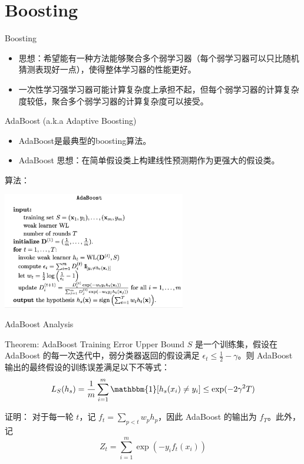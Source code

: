 \section{Boosting}

\begin{frame}{Boosting}
\begin{itemize}
    \item 思想：希望能有一种方法能够聚合多个弱学习器（每个弱学习器可以只比随机猜测表现好一点），使得整体学习器的性能更好。
    \item 一次性学习强学习器可能计算复杂度上承担不起，但每个弱学习器的计算复杂度较低，聚合多个弱学习器的计算复杂度可以接受。
\end{itemize}
\end{frame}

\begin{frame}{AdaBoost (a.k.a Adaptive Boosting)}
\begin{itemize}
    \item AdaBoost是最典型的boosting算法。
    \item AdaBoost 思想：在简单假设类上构建线性预测期作为更强大的假设类。
\end{itemize}
算法：
\begin{center}
    \includegraphics[width=0.6\textwidth]{assets/adaboost.png}
\end{center}
\end{frame}

\begin{frame}{AdaBoost Analysis}
    \begin{block}{Theorem: AdaBoost Training Error Upper Bound}
        $S$ 是一个训练集，假设在 AdaBoost 的每一次迭代中，弱分类器返回的假设满足 $\epsilon_t \leq \frac{1}{2} - \gamma$。则 AdaBoost 输出的最终假设的训练误差满足以下不等式：
        \[
        L_S(h_s) = \frac{1}{m} \sum_{i=1}^{m} \mathbbm{1}[h_s(x_i) \neq y_i] \leq \exp(-2 \gamma^2 T)
        \]
    \end{block}
    证明：
    对于每一轮 $t$，记 $f_t = \sum_{p<t} w_p h_p$，因此 AdaBoost 的输出为 $f_T$。此外，记
\[
Z_t = \sum_{i=1}^{m} \exp(-y_i f_t(x_i))
\]

\end{frame}

